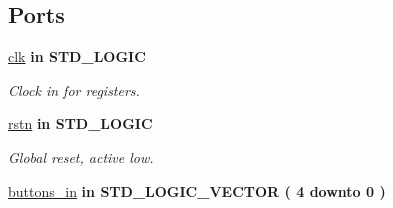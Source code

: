 \subsection*{Ports}
 \begin{DoxyCompactItemize}
\item 
\hypertarget{classbutton__control_a8120037e0ee47c35ba2d79242209c72e}{\hyperlink{classbutton__control_a8120037e0ee47c35ba2d79242209c72e}{clk}  {\bfseries {\bfseries \textcolor{vhdlkeyword}{in}\textcolor{vhdlchar}{ }}} {\bfseries \textcolor{comment}{S\-T\-D\-\_\-\-L\-O\-G\-I\-C}\textcolor{vhdlchar}{ }} }\label{classbutton__control_a8120037e0ee47c35ba2d79242209c72e}

\begin{DoxyCompactList}\small\item\em Clock in for registers. \end{DoxyCompactList}\item 
\hypertarget{classbutton__control_aba021aec4b477b89079bb58ccadcc67e}{\hyperlink{classbutton__control_aba021aec4b477b89079bb58ccadcc67e}{rstn}  {\bfseries {\bfseries \textcolor{vhdlkeyword}{in}\textcolor{vhdlchar}{ }}} {\bfseries \textcolor{comment}{S\-T\-D\-\_\-\-L\-O\-G\-I\-C}\textcolor{vhdlchar}{ }} }\label{classbutton__control_aba021aec4b477b89079bb58ccadcc67e}

\begin{DoxyCompactList}\small\item\em Global reset, active low. \end{DoxyCompactList}\item 
\hypertarget{classbutton__control_a7767950aafd1dd8ca4b5c572d49dfdff}{\hyperlink{classbutton__control_a7767950aafd1dd8ca4b5c572d49dfdff}{buttons\-\_\-in}  {\bfseries {\bfseries \textcolor{vhdlkeyword}{in}\textcolor{vhdlchar}{ }}} {\bfseries \textcolor{comment}{S\-T\-D\-\_\-\-L\-O\-G\-I\-C\-\_\-\-V\-E\-C\-T\-O\-R}\textcolor{vhdlchar}{ }\textcolor{vhdlchar}{(}\textcolor{vhdlchar}{ }\textcolor{vhdlchar}{ } \textcolor{vhdldigit}{4} \textcolor{vhdlchar}{ }\textcolor{vhdlchar}{ }\textcolor{vhdlchar}{ }\textcolor{vhdlkeyword}{downto}\textcolor{vhdlchar}{ }\textcolor{vhdlchar}{ }\textcolor{vhdlchar}{ } \textcolor{vhdldigit}{0} \textcolor{vhdlchar}{ }\textcolor{vhdlchar}{)}\textcolor{vhdlchar}{ }} }\label{classbutton__control_a7767950aafd1dd8ca4b5c572d49dfdff}


\end{DoxyCompactItemize}

